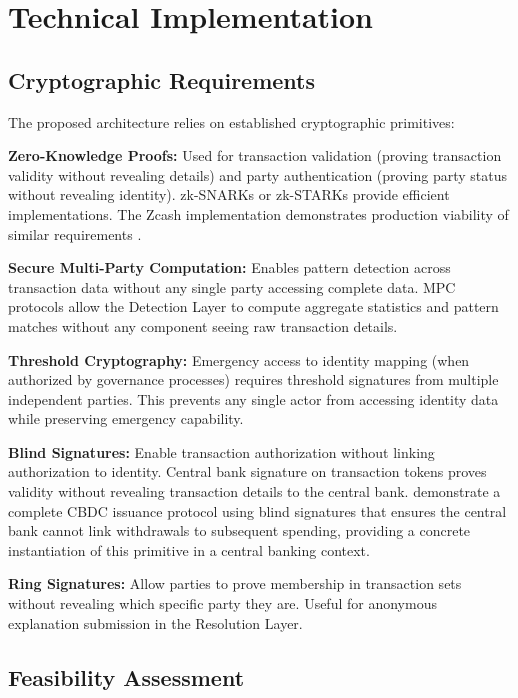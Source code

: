 \documentclass[11pt]{article}
\begin{document}
\section{Technical Implementation}

\subsection{Cryptographic Requirements}

The proposed architecture relies on established cryptographic primitives:

\textbf{Zero-Knowledge Proofs:} Used for transaction validation (proving transaction validity without revealing details) and party authentication (proving party status without revealing identity). zk-SNARKs or zk-STARKs provide efficient implementations. The Zcash implementation demonstrates production viability of similar requirements \citep{Sasson2014}.

\textbf{Secure Multi-Party Computation:} Enables pattern detection across transaction data without any single party accessing complete data. MPC protocols allow the Detection Layer to compute aggregate statistics and pattern matches without any component seeing raw transaction details.

\textbf{Threshold Cryptography:} Emergency access to identity mapping (when authorized by governance processes) requires threshold signatures from multiple independent parties. This prevents any single actor from accessing identity data while preserving emergency capability.

\textbf{Blind Signatures:} Enable transaction authorization without linking authorization to identity. Central bank signature on transaction tokens proves validity without revealing transaction details to the central bank. \citet{ChaumGrothoffMoser2021} demonstrate a complete CBDC issuance protocol using blind signatures that ensures the central bank cannot link withdrawals to subsequent spending, providing a concrete instantiation of this primitive in a central banking context.

\textbf{Ring Signatures:} Allow parties to prove membership in transaction sets without revealing which specific party they are. Useful for anonymous explanation submission in the Resolution Layer.

\subsection{Feasibility Assessment}
\end{document}
